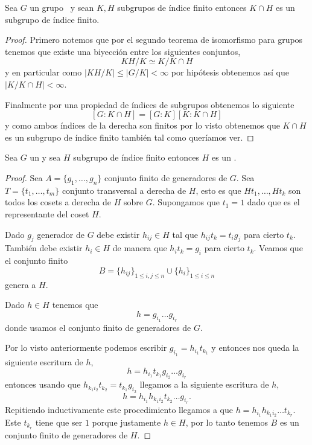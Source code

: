 \documentclass[tesis.tex]{subfiles}
\begin{document}
\begin{lema}\label{lema_indice_interseccion}
	Sea $G$ un grupo \fg \  y sean $K,H$ subgrupos de índice finito entonces $K \cap H$ es un subgrupo de índice finito.
\end{lema}
\begin{proof}
	Primero notemos que por el segundo teorema de isomorfismo para grupos tenemos que existe una biyección entre los siguientes conjuntos,
	\[
		KH / K \simeq K / K \cap H
	\]
	y en particular como $|KH / K| \le |G / K| < \infty$ por hipótesis obtenemos así que $|K / K \cap H| < \infty$.
	
	Finalmente por una propiedad de índices de subgrupos obtenemos lo siguiente
	\[
		[G:K\cap H] = [G:K][K: K \cap H]
	\]
	 y como ambos índices de la derecha son finitos por lo visto obtenemos que $K \cap H$ es un subgrupo de índice finito también tal como queríamos ver.
\end{proof}

\begin{lema}\label{lema_subg_fg}
	Sea $G$ un \fg y sea $H$ subgrupo de índice finito entonces $H$ es un \fg.
\end{lema}
\begin{proof}
	Sea $A = \{g_1, \dots, g_n\}$ conjunto finito de generadores de $G$.
	Sea $T =\{t_1, \dots, t_m\}$ conjunto transversal a derecha de $H$, esto es que $Ht_1, \dots, Ht_k$ son todos los cosets a derecha de $H$ sobre $G$.
	Supongamos que $t_1=1$ dado que es el representante del coset $H$.

	Dado $g_j$ generador de $G$ debe existir $h_{ij} \in H$ tal que $h_{ij}t_{k} = t_ig_j$ para cierto $t_k$.
	También debe existir $h_i \in H$ de manera que $ h_i t_{k} = g_i$ para cierto $t_k$.
	Veamos que el conjunto finito 
	\[
		B = \{ h_{ ij}  \}_{1 \le i,j \le n } \cup \{ h_i \}_{1 \le i \le n}
	\]
	 genera a $H$.
	
	Dado $h \in H$ tenemos que 
	\[
		h = g_{i_1}\dots g_{i_r}
	\]
	donde usamos el conjunto finito de generadores de $G$.
	
	Por lo visto anteriormente podemos escribir  $g_{i_1} = h_{i_1}t_{k_1}$ y entonces nos queda la siguiente escritura de $h$,
	\[
		h = h_{i_1}t_{k_1} g_{i_2}\dots g_{i_r}
	\]
	entonces usando que $h_{k_{1}i_{2}}t_{k_2} = t_{k_1}g_{i_2} $ llegamos a la siguiente escritura de $h$,
	\[
	h = h_{i_1}h_{k_{1}i_{2}}t_{k_2}\dots g_{i_r}.
	\]
	Repitiendo inductivamente este procedimiento llegamos a que $h =h_{i_1}h_{k_{1}i_{2}} \dots t_{k_r}$.
	Este $t_{k_r}$ tiene que ser $1$ porque justamente $h \in H$, por lo tanto tenemos $B$ es un conjunto finito de generadores de $H$.
\end{proof}
\end{document}
